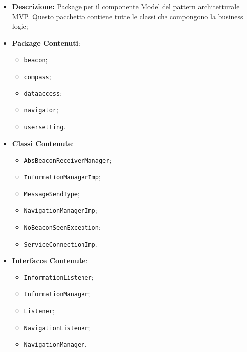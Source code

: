 \documentclass[../DefinizioneDiProdotto.tex]{subfiles}
\begin{document}
\begin{itemize}
	\item \textbf{Descrizione:} Package per il componente Model del pattern architetturale MVP. Questo pacchetto contiene tutte le classi che compongono la business logic;
	\item \textbf{Package Contenuti}:
	\begin{itemize}
		\item \texttt{beacon};
		
		\item \texttt{compass};
		
		\item \texttt{dataaccess};
		
		\item \texttt{navigator};
		
		\item \texttt{usersetting}.
		
	\end{itemize}
	\item \textbf{Classi Contenute}:
	\begin{itemize}
		\item \texttt{AbsBeaconReceiverManager};
		
		\item \texttt{InformationManagerImp};
		
		\item \texttt{MessageSendType};
		
		\item \texttt{NavigationManagerImp};
		
		\item \texttt{NoBeaconSeenException};
		
		\item \texttt{ServiceConnectionImp}.
		
	\end{itemize}
	\item \textbf{Interfacce Contenute}:
	\begin{itemize}
		\item \texttt{InformationListener};
		
		\item \texttt{InformationManager};
		
		\item \texttt{Listener};
		
		\item \texttt{NavigationListener};
		
		\item \texttt{NavigationManager}.
		
	\end{itemize}
\end{itemize}
\end{document}
